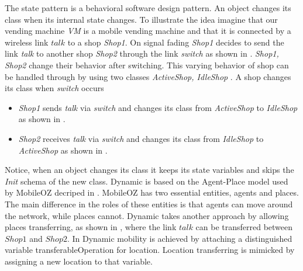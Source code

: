 The state pattern is a behavioral software design pattern. An object changes its class when its internal state changes. To illustrate the idea imagine that our vending machine \textit{VM} is a mobile vending machine and that it is connected by a wireless link $talk$ to a shop \textit{Shop1}. On signal fading \textit{Shop1} decides to send the link \textit{talk} to another shop \textit{Shop2} through the link \textit{switch} as shown in . \textit{Shop1, Shop2} change their behavior after switching. This varying behavior of shop can be handled through by using two classes \textit{ActiveShop, IdleShop} . A shop changes its class when \textit{switch} occurs
\begin{itemize}
\item \textit{Shop1} sends \textit{talk} via \textit{switch} and changes its class from \textit{ActiveShop} to \textit{IdleShop} as shown in .
\item \textit{Shop2} receives \textit{talk} via  \textit{switch} and changes its class from \textit{IdleShop} to \textit{ActiveShop} as shown in .
\end{itemize}
Notice, when an object changes its class it keeps its state variables and skips the \textit{Init} schema of the new class.
Dynamic \oz{} is based on the Agent-Place model used by MobileOZ decriped in \cite{Kenji2}. MobileOZ has two
essential entities, agents and places. The main difference in the roles of these entities is that agents can move around the network, while places cannot. Dynamic \oz{} takes another approach by allowing places transferring, as shown in , where the link $talk$ can be transferred between $Shop1$ and $Shop2$. In Dynamic \oz{} mobility is achieved
by attaching a distinguished variable transferableOperation for location. Location transferring
is mimicked by assigning a new location to that variable.



